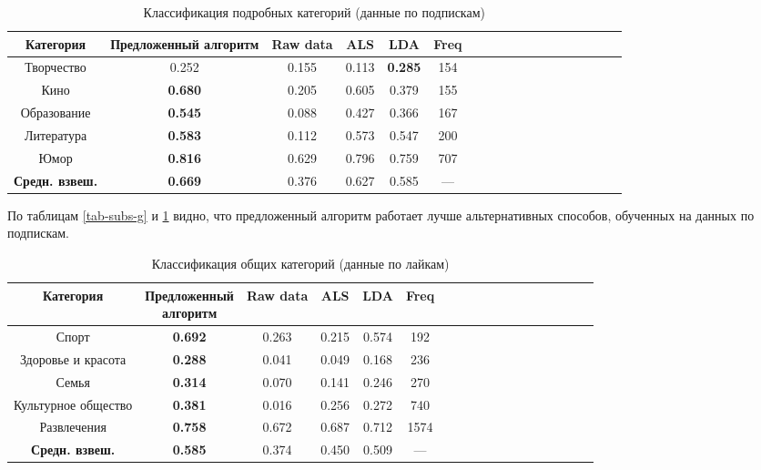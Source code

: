 \documentclass[times,specification,annotation]{itmo-student-thesis}
\begin{document}
\begin{table}[!h]
\caption{Классификация подробных категорий (данные по подпискам)}\label{tab-subs-d}
\centering
\begin{tabular}{|*{18}{c|}}\hline
Категория & Предложенный алгоритм  & Raw data & ALS & LDA & Freq \\\hline
Творчество                    & 0.252 & 0.155 & 0.113 & \textbf{0.285} & 154  \\\hline
Кино       & \textbf{0.680} & 0.205 & 0.605 & 0.379 & 155 \\\hline
Образование   & \textbf{0.545} & 0.088 & 0.427 & 0.366 & 167 \\\hline
Литература  & \textbf{0.583} & 0.112 & 0.573 & 0.547 & 200 \\\hline
Юмор                  & \textbf{0.816} & 0.629 & 0.796 & 0.759 &  707 \\\hline
\textbf{Средн. взвеш.}   & \textbf{0.669} & 0.376 & 0.627 & 0.585  & --- \\\hline
\end{tabular}
\end{table}

По таблицам \ref{tab-subs-g} и \ref{tab-subs-d} видно, что предложенный алгоритм работает лучше альтернативных способов, обученных на данных по подпискам.  

\begin{table}[!h]
\caption{Классификация общих категорий (данные по лайкам)}\label{tab-likes-g}
\centering
\begin{tabular}{|*{18}{c|}}\hline
Категория & \thead{Предложенный \\ алгоритм}  & Raw data & ALS & LDA & Freq \\\hline
Спорт                         &  \textbf{0.692} & 0.263 & 0.215 & 0.574 & 192 \\\hline
Здоровье и красота                         &  \textbf{0.288} & 0.041 & 0.049 & 0.168 & 236 \\\hline
Семья       &  \textbf{0.314} & 0.070 & 0.141 & 0.246 & 270  \\\hline
Культурное общество   &  \textbf{0.381} & 0.016 & 0.256 & 0.272 & 740 \\\hline
Развлечения &  \textbf{0.758} & 0.672 & 0.687 & 0.712 & 1574 \\\hline
\textbf{Средн. взвеш.}                  &  \textbf{0.585} & 0.374 & 0.450 & 0.509 & --- \\\hline
\end{tabular}
\end{table}
\end{document}
